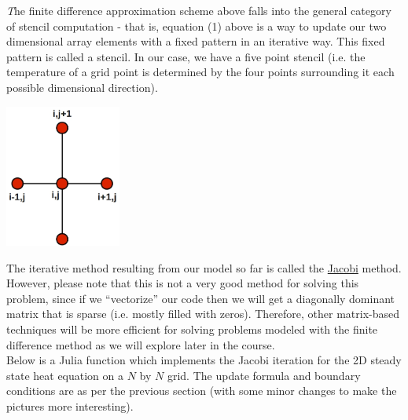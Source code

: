 \documentclass[11pt,a4paper,oneside]{report}
\begin{document}
{\it\huge T}he finite difference approximation scheme above falls into the general category of stencil computation - that is, equation (1) above is a way to update our two dimensional array elements with  a fixed pattern in an iterative way. This fixed pattern is called a stencil. In our case, we have a five point stencil (i.e. the temperature of a grid point is determined by the four points surrounding it each possible dimensional direction).

\begin{center}
\includegraphics[width=1.5in]{Five-point-stencil.jpg}
\end{center}

The iterative method resulting from our model so far is called the \href{http://en.wikipedia.org/wiki/Carl_Gustav_Jakob_Jacobi}{Jacobi} method. However, please note that this is not a very good method for solving this problem, since if we ``vectorize'' our code then we will get a diagonally dominant matrix that is sparse (i.e. mostly filled with zeros). Therefore, other matrix-based techniques will be more efficient for solving problems modeled with the finite difference method as we will explore later in the course. \\

Below is a Julia function which implements the Jacobi iteration for the 2D steady state heat equation on a $N$ by $N$ grid. The update formula and boundary conditions are as per the previous section (with some minor changes to make the pictures more interesting).\\
\end{document}
